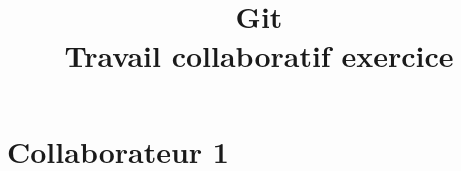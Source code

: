 \documentclass[11pt,a4paper]{article}
\title{Git\\\large Travail collaboratif exercice}
\author{}
\date{}
\begin{document}
	
	\maketitle
	\tableofcontents
	
	\section{Collaborateur 1}
	
	
	
	
\end{document}
